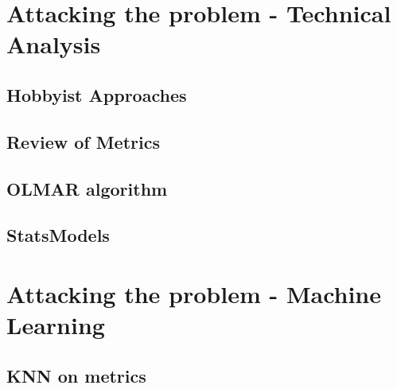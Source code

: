 \documentclass{report}
\begin{document}
\section{Attacking the problem - Technical Analysis}
\subsection{Hobbyist Approaches}
\subsection{Review of Metrics}
\subsection{OLMAR algorithm}
\subsection{StatsModels}

\section{Attacking the problem - Machine Learning}
\subsection{KNN on metrics}

\cite {website:pybrain-tutorial}



\end{document}
